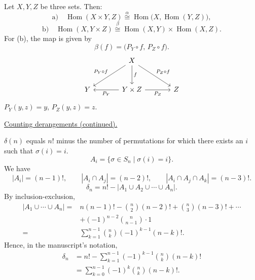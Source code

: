 \medskip
\noindent{}

\medskip
\noindent{}\quad Let $X,Y,Z$ be three sets. Then:
\[
 \text{a)}\quad
 \operatorname{Hom}(X\times Y,Z)
 \overset{\alpha}{\cong}
 \operatorname{Hom}\bigl(X,\operatorname{Hom}(Y,Z)\bigr),
\]
\[
 \text{b)}\quad
 \operatorname{Hom}(X,Y\times Z)
 \overset{\beta}{\cong}
 \operatorname{Hom}(X,Y)\times\operatorname{Hom}(X,Z).
\]
\noindent For (b), the map is given by
\[
 \beta(f)=\bigl(P_Y\circ f,\,P_Z\circ f\bigr).
\]
\[
\begin{tikzcd}[column sep=large,row sep=large]
 & X \arrow[dl,swap,"P_Y\circ f"] \arrow[d,"f"]
     \arrow[dr,"P_Z\circ f"] & \\
 Y & Y\times Z \arrow[l,"P_Y"] \arrow[r,swap,"P_Z"] & Z
\end{tikzcd}
\]
\noindent $P_Y(y,z)=y$, $P_Z(y,z)=z$.

\bigskip
\noindent{}\quad \underline{Counting derangements (continued).}

\noindent $\delta(n)$ equals $n!$ minus the number of permutations
 for which there exists an $i$ such that $\sigma(i)=i$.
\[
 A_i=\{\sigma\in S_n\mid\sigma(i)=i\}.
\]
\noindent We have
\[
 |A_i|=(n-1)!,\qquad
 |A_i\cap A_j|=(n-2)!,\qquad
 |A_i\cap A_j\cap A_k|=(n-3)!.
\]
\[
 \delta_n=n!-\bigl|A_1\cup A_2\cup\cdots\cup A_n\bigr|.
\]
\noindent By inclusion-exclusion,
\[
\begin{aligned}
 \bigl|A_1\cup\cdots\cup A_n\bigr|
  ={}&n(n-1)!-\binom{n}{2}(n-2)!+\binom{n}{3}(n-3)!+\cdots\\
     &+(-1)^{n-2}\binom{n}{n-1}\cdot1\\
  ={}&\sum_{k=1}^{n-1}\binom{n}{k}(-1)^{k-1}(n-k)!.
\end{aligned}
\]
\noindent Hence, in the manuscript's notation,
\[
\begin{aligned}
 \delta_n
  &=n!-\sum_{k=1}^{n-1}(-1)^{k-1}\binom{n}{k}(n-k)!\\
  &=\boxed{\displaystyle\sum_{k=0}^{n-1}(-1)^k\binom{n}{k}(n-k)!}.
\end{aligned}
\]
